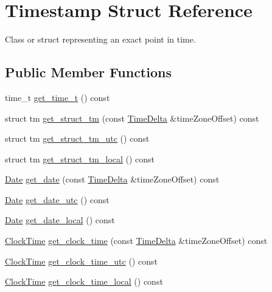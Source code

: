\hypertarget{structTimestamp}{\section{\-Timestamp \-Struct \-Reference}
\label{structTimestamp}
}


\-Class or struct representing an exact point in time.  


\subsection*{\-Public \-Member \-Functions}
\begin{DoxyCompactItemize}
\item 
time\-\_\-t \hyperlink{structTimestamp_a54782bcc812fdeea952ec0e0880aac5f}{get\-\_\-time\-\_\-t} () const 
\item 
struct tm \hyperlink{structTimestamp_ad75f04af1d0b038a2d43b117f72dee65}{get\-\_\-struct\-\_\-tm} (const \hyperlink{structTimeDelta}{\-Time\-Delta} \&time\-Zone\-Offset) const 
\item 
struct tm \hyperlink{structTimestamp_a763f8ab757e5d6cfb45c7931f75c5654}{get\-\_\-struct\-\_\-tm\-\_\-utc} () const 
\item 
struct tm \hyperlink{structTimestamp_abc2107430b61e373e5ff84d16c1a097a}{get\-\_\-struct\-\_\-tm\-\_\-local} () const 
\item 
\hyperlink{structDate}{\-Date} \hyperlink{structTimestamp_a07b4b2e5d95a2b23fe48c9682435c727}{get\-\_\-date} (const \hyperlink{structTimeDelta}{\-Time\-Delta} \&time\-Zone\-Offset) const 
\item 
\hyperlink{structDate}{\-Date} \hyperlink{structTimestamp_a4dd9ee5c1ceaad6d4f497487a3e666f5}{get\-\_\-date\-\_\-utc} () const 
\item 
\hyperlink{structDate}{\-Date} \hyperlink{structTimestamp_a77a1ae0ca0b09af2adc5f7f49b6c6618}{get\-\_\-date\-\_\-local} () const 
\item 
\hyperlink{structClockTime}{\-Clock\-Time} \hyperlink{structTimestamp_a8e4b0ee005f58cb645d945eaccd1bc9e}{get\-\_\-clock\-\_\-time} (const \hyperlink{structTimeDelta}{\-Time\-Delta} \&time\-Zone\-Offset) const 
\item 
\hyperlink{structClockTime}{\-Clock\-Time} \hyperlink{structTimestamp_a0767fd3f69eaa11bb094eb330d9c88ef}{get\-\_\-clock\-\_\-time\-\_\-utc} () const 
\item 
\hyperlink{structClockTime}{\-Clock\-Time} \hyperlink{structTimestamp_a773a47fcdd02afef5d307bcc65561f8c}{get\-\_\-clock\-\_\-time\-\_\-local} () const 

\end{DoxyCompactItemize}
